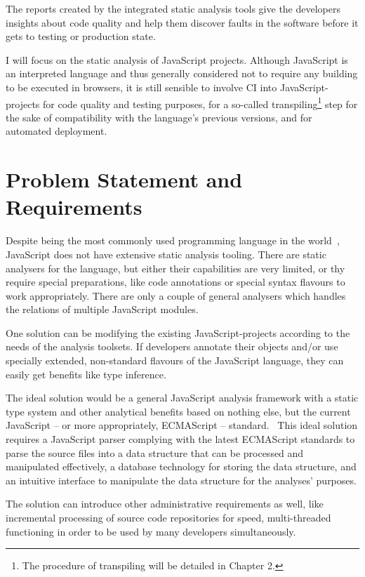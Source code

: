 The reports created by the integrated static analysis tools give the developers insights about code quality and help them discover faults in the software before it gets to testing or production state.

I will focus on the static analysis of JavaScript projects. Although JavaScript is an interpreted language and thus generally considered not to require any building to be executed in browsers, it is still sensible to involve CI into JavaScript-projects for code quality and testing purposes, for a so-called transpiling\footnote{The procedure of transpiling will be detailed in Chapter 2.} step for the sake of compatibility with the language's previous versions, and for automated deployment.


\section{Problem Statement and Requirements}

Despite being the most commonly used programming language in the world~\cite{javascriptstackoverflow}, JavaScript does not have extensive static analysis tooling. There are static analysers for the language, but either their capabilities are very limited, or thy require special preparations, like code annotations or special syntax flavours to work appropriately. There are only a couple of general analysers which handles the relations of multiple JavaScript modules.

One solution can be modifying the existing JavaScript-projects according to the needs of the analysis toolsets. If developers annotate their objects and/or use specially extended, non-standard flavours of the JavaScript language, they can easily get benefits like type inference.

The ideal solution would be a general JavaScript analysis framework with a static type system and other analytical benefits based on nothing else, but the current JavaScript – or more appropriately, ECMAScript – standard.~\cite{ecmascriptstandard} This ideal solution requires a JavaScript parser complying with the latest ECMAScript standards to parse the source files into a data structure that can be processed and manipulated effectively, a database technology for storing the data structure, and an intuitive interface to manipulate the data structure for the analyses' purposes.

The solution can introduce other administrative requirements as well, like incremental processing of source code repositories for speed, multi-threaded functioning in order to be used by many developers simultaneously.


